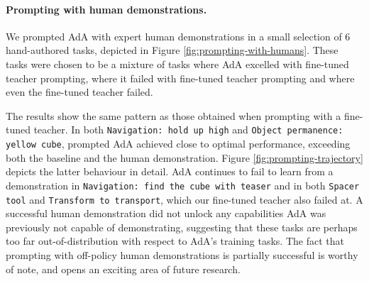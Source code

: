 \paragraph{Prompting with human demonstrations.} We prompted AdA with expert human demonstrations in a small selection of 6 hand-authored tasks, depicted in Figure \ref{fig:prompting-with-humans}. These tasks were chosen to be a mixture of tasks where AdA excelled with fine-tuned teacher prompting, where it failed with fine-tuned teacher prompting and where even the fine-tuned teacher failed. 

The results show the same pattern as those obtained when prompting with a fine-tuned teacher. In both \texttt{Navigation: hold up high} and \texttt{Object permanence: yellow cube}, prompted AdA achieved close to optimal performance, exceeding both the baseline and the human demonstration. Figure \ref{fig:prompting-trajectory} depicts the latter behaviour in detail. AdA continues to fail to learn from a demonstration in \texttt{Navigation: find the cube with teaser} and in both \texttt{Spacer tool} and \texttt{Transform to transport}, which our fine-tuned teacher also failed at. A successful human demonstration did not unlock any capabilities AdA was previously not capable of demonstrating, suggesting that these tasks are perhaps too far out-of-distribution with respect to AdA's training tasks. The fact that prompting with off-policy human demonstrations is partially successful is worthy of note, and opens an exciting area of future research. 